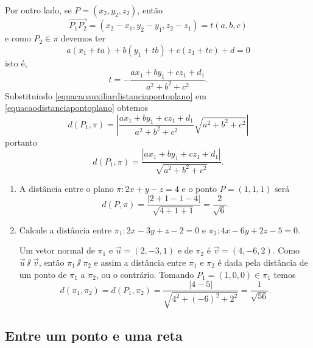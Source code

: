 Por outro lado, se $P = (x_2, y_2, z_2)$, ent\~ao
\[
    \vec{P_1P_2} = (x_2 - x_1, y_2 - y_1, z_2 - z_1) = t(a,b,c)
\]
e como $P_2 \in \pi$ devemos ter
\[
    a(x_1 + ta) + b(y_1 + tb) + c(z_1 + tc) + d = 0
\]
isto \'e,
\begin{equation}\label{equacaoauxiliardistanciapontoplano}
    t = -\dfrac{ax_1 + by_1 + cz_1 + d_1}{a^2 + b^2 + c^2}.
\end{equation}
Substituindo \eqref{equacaoauxiliardistanciapontoplano} em \eqref{equacaodistanciapontoplano} obtemos
\[
    d(P_1,\pi) = \left|\dfrac{ax_1 + by_1 + cz_1 + d_1}{a^2 + b^2 + c^2}\sqrt{a^2 + b^2 + c^2}\right|
\]
portanto
\[
    d(P_1,\pi) = \dfrac{|ax_1 + by_1 + cz_1 + d_1|}{\sqrt{a^2 + b^2 + c^2}}.
\]

\begin{exemplos}
    \begin{enumerate}
        \item A dist\^ancia entre o plano $\pi: 2x + y - z = 4$ e o ponto $P = (1,1,1)$ ser\'a
        \[
            d(P,\pi) = \dfrac{|2 + 1 - 1 - 4|}{\sqrt{4 + 1 + 1}} = \dfrac{2}{\sqrt{6}}.
        \]
        \item Calcule a dist\^ancia entre $\pi_1 : 2x - 3y + z - 2 = 0$ e $\pi_2 : 4x - 6y + 2z - 5 = 0$.
        \begin{solucao}
            Um vetor normal de $\pi_1$ e $\vec{u} = (2,-3,1)$ e de $\pi_2$ \'e $\vec{v} = (4,-6,2)$. Como $\vec{u}\varparallel\vec{v}$, ent\~ao $\pi_1\varparallel\pi_2$ e assim a dist\^ancia entre $\pi_1$ e $\pi_2$ \'e dada pela dist\^ancia de um ponto de $\pi_1$ a $\pi_2$, ou o contr\'ario. Tomando $P_1 = (1,0,0)\in\pi_1$ temos
            \[
                d(\pi_1,\pi_2) = d(P_1,\pi_2) = \dfrac{|4-5|}{\sqrt{4^2 + (-6)^2 + 2^2}} = \dfrac{1}{\sqrt{56}}.
            \]
        \end{solucao}
    \end{enumerate}
\end{exemplos}


\subsection{Entre um ponto e uma reta} %
\label{sub:entre_um_ponto_e_uma_reta}

